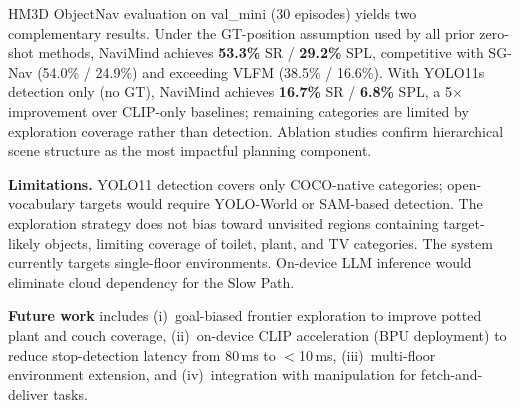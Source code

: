\documentclass[conference]{IEEEtran}
\begin{document}
HM3D ObjectNav evaluation on val\_mini (30 episodes) yields two complementary results.
Under the GT-position assumption used by all prior zero-shot methods, NaviMind achieves \textbf{53.3\%} SR / \textbf{29.2\%} SPL, competitive with SG-Nav (54.0\% / 24.9\%) and exceeding VLFM (38.5\% / 16.6\%).
With YOLO11s detection only (no GT), NaviMind achieves \textbf{16.7\%} SR / \textbf{6.8\%} SPL, a 5$\times$ improvement over CLIP-only baselines; remaining categories are limited by exploration coverage rather than detection.
Ablation studies confirm hierarchical scene structure as the most impactful planning component.

\textbf{Limitations.}
YOLO11 detection covers only COCO-native categories; open-vocabulary targets would require YOLO-World or SAM-based detection.
The exploration strategy does not bias toward unvisited regions containing target-likely objects, limiting coverage of toilet, plant, and TV categories.
The system currently targets single-floor environments.
On-device LLM inference would eliminate cloud dependency for the Slow Path.

\textbf{Future work} includes (i)~goal-biased frontier exploration to improve potted plant and couch coverage, (ii)~on-device CLIP acceleration (BPU deployment) to reduce stop-detection latency from 80\,ms to $<$10\,ms, (iii)~multi-floor environment extension, and (iv)~integration with manipulation for fetch-and-deliver tasks.

\balance

\end{document}
